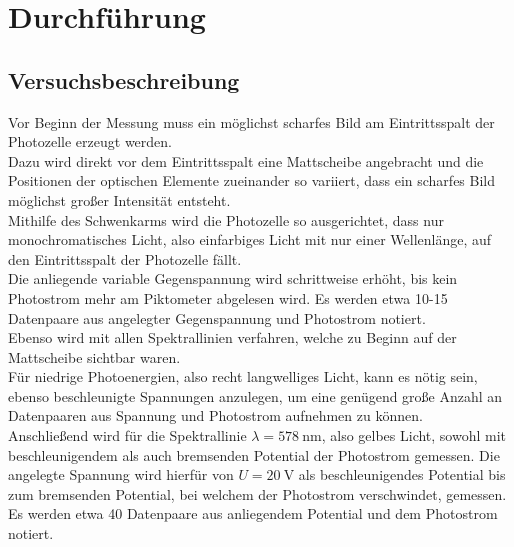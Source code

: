 \section{Durchführung}
\label{sec:Durchführung}



\subsection{Versuchsbeschreibung}
\label{sec:Versuchsbeschreibung}
Vor Beginn der Messung muss ein möglichst scharfes Bild am Eintrittsspalt der Photozelle erzeugt werden.\\
Dazu wird direkt vor dem Eintrittsspalt eine Mattscheibe angebracht und die Positionen der optischen Elemente zueinander so variiert, dass ein scharfes Bild möglichst großer Intensität entsteht.\\
Mithilfe des Schwenkarms wird die Photozelle so ausgerichtet, dass nur monochromatisches Licht, also einfarbiges Licht mit nur einer Wellenlänge, auf den Eintrittsspalt der Photozelle fällt.\\
Die anliegende variable Gegenspannung wird schrittweise erhöht, bis kein Photostrom mehr am Piktometer abgelesen wird. Es werden etwa 10-15 Datenpaare aus angelegter Gegenspannung und Photostrom notiert.\\
Ebenso wird mit allen Spektrallinien verfahren, welche zu Beginn auf der Mattscheibe sichtbar waren.\\
Für niedrige Photoenergien, also recht langwelliges Licht, kann es nötig sein, ebenso beschleunigte Spannungen anzulegen, um eine genügend große Anzahl an Datenpaaren aus Spannung und Photostrom aufnehmen zu können.\\
Anschließend wird für die Spektrallinie $\lambda=\SI{578}{\nano\meter}$, also gelbes Licht, sowohl mit beschleunigendem als auch bremsenden Potential der Photostrom gemessen.
Die angelegte Spannung wird hierfür von $U=\SI{+20}{\volt}$ als beschleunigendes Potential bis zum bremsenden Potential, bei welchem der Photostrom verschwindet, gemessen.
Es werden etwa 40 Datenpaare aus anliegendem Potential und dem Photostrom notiert.
